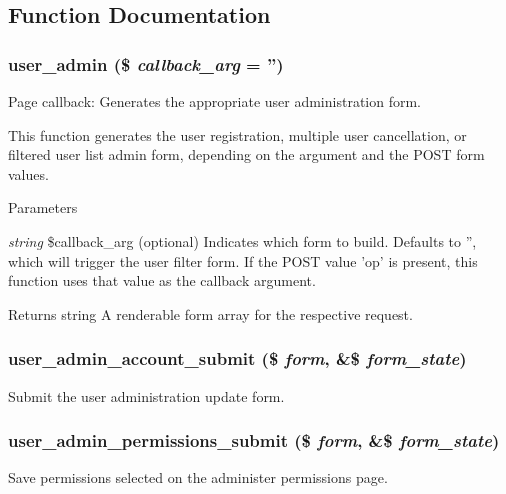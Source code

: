 \subsection{Function Documentation}
\hypertarget{user_8admin_8inc_a16b515af1b1f5d114383d668812c0b9b}{
\subsubsection[{user\_\-admin}]{\setlength{\rightskip}{0pt plus 5cm}user\_\-admin (\$ {\em callback\_\-arg} = {\ttfamily ''})}}
\label{user_8admin_8inc_a16b515af1b1f5d114383d668812c0b9b}
Page callback: Generates the appropriate user administration form.

This function generates the user registration, multiple user cancellation, or filtered user list admin form, depending on the argument and the POST form values.


\begin{DoxyParams}{Parameters}
\item[{\em string}]\$callback\_\-arg (optional) Indicates which form to build. Defaults to '', which will trigger the user filter form. If the POST value 'op' is present, this function uses that value as the callback argument.\end{DoxyParams}
\begin{DoxyReturn}{Returns}
string A renderable form array for the respective request. 
\end{DoxyReturn}
\hypertarget{user_8admin_8inc_a20540c356ad435d034ff0229323f33d5}{
\subsubsection[{user\_\-admin\_\-account\_\-submit}]{\setlength{\rightskip}{0pt plus 5cm}user\_\-admin\_\-account\_\-submit (\$ {\em form}, \/  \&\$ {\em form\_\-state})}}
\label{user_8admin_8inc_a20540c356ad435d034ff0229323f33d5}
Submit the user administration update form. \hypertarget{user_8admin_8inc_a05efed62d2fe9e10ee50a21b54f6ec31}{
\subsubsection[{user\_\-admin\_\-permissions\_\-submit}]{\setlength{\rightskip}{0pt plus 5cm}user\_\-admin\_\-permissions\_\-submit (\$ {\em form}, \/  \&\$ {\em form\_\-state})}}
\label{user_8admin_8inc_a05efed62d2fe9e10ee50a21b54f6ec31}
Save permissions selected on the administer permissions page.

